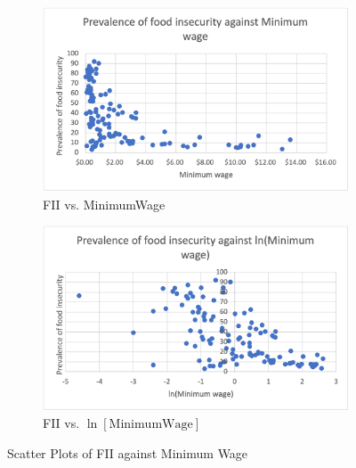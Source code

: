\documentclass{article}
\begin{document}
\begin{appendices}
\begin{figure}[H]
     \centering
     \begin{subfigure}[b]{0.475\textwidth}
         \centering
         \includegraphics[width=\textwidth]{Images/minwage.png}
         \caption{FII vs. MinimumWage}
         \label{fig:ffiminwagescatter}
     \end{subfigure}
     \hfill
     \begin{subfigure}[b]{0.475\textwidth}
         \centering
         \includegraphics[width=\textwidth]{Images/lnminwage.png}
         \caption{FII vs. $\ln{[\text{MinimumWage}]}$}
         \label{fig:ffilnminwagescatter}
     \end{subfigure}
    \caption{Scatter Plots of FII against Minimum Wage}
    \label{fig:scatterminwage}
\end{figure}


\end{appendices}
\end{document}
